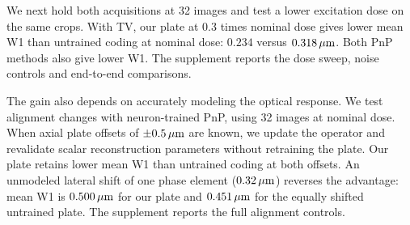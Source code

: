 We next hold both acquisitions at 32 images and test a lower excitation dose on the same crops. With TV, our plate at 0.3 times nominal dose gives lower mean W1 than untrained coding at nominal dose: $0.234$ versus $0.318\,\mu\mathrm{m}$. Both PnP methods also give lower W1. The supplement reports the dose sweep, noise controls and end-to-end comparisons.

The gain also depends on accurately modeling the optical response. We test alignment changes with neuron-trained PnP, using 32 images at nominal dose. When axial plate offsets of $\pm0.5\,\mu\mathrm{m}$ are known, we update the operator and revalidate scalar reconstruction parameters without retraining the plate. Our plate retains lower mean W1 than untrained coding at both offsets. An unmodeled lateral shift of one phase element ($0.32\,\mu\mathrm{m}$) reverses the advantage: mean W1 is $0.500\,\mu\mathrm{m}$ for our plate and $0.451\,\mu\mathrm{m}$ for the equally shifted untrained plate. The supplement reports the full alignment controls.
